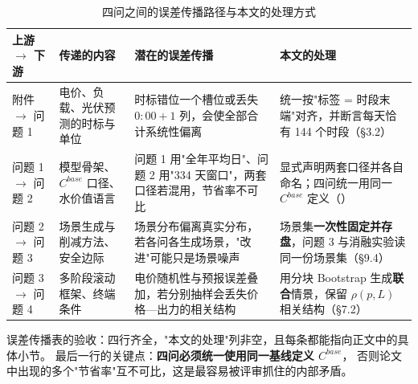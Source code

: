 \begin{table}[htbp]
  \centering
  \caption{四问之间的误差传播路径与本文的处理方式}
  \label{tab:errorprop}
  \footnotesize
  \begin{tabularx}{\linewidth}{L{2.0cm} L{3.4cm} L{4.2cm} Y}
    \toprule
    上游 \(\rightarrow\) 下游 & 传递的内容 & 潜在的误差传播 & 本文的处理 \\
    \midrule
    附件 \(\rightarrow\) 问题 1
      & 电价、负载、光伏预测的时标与单位
      & 时标错位一个槽位或丢失 \(0{:}00{+}1\) 列，会使全部合计系统性偏离
      & 统一按"标签 = 时段末端"对齐，并断言每天恰有 144 个时段（§3.2） \\
    \addlinespace
    问题 1 \(\rightarrow\) 问题 2
      & 模型骨架、\(C^{base}\) 口径、水价值语言
      & 问题 1 用"全年平均日"、问题 2 用"334 天窗口"，两套口径若混用，节省率不可比
      & 显式声明两套口径并各自命名；四问统一用同一 \(C^{base}\) 定义（） \\
    \addlinespace
    问题 2 \(\rightarrow\) 问题 3
      & 场景生成与削减方法、安全边际
      & 场景分布偏离真实分布，若各问各生成场景，"改进"可能只是场景噪声
      & 场景集\textbf{一次性固定并存盘}，问题 3 与消融实验读同一份场景集（§9.4） \\
    \addlinespace
    问题 3 \(\rightarrow\) 问题 4
      & 多阶段滚动框架、终端条件
      & 电价随机性与预报误差叠加，若分别抽样会丢失价格—出力的相关结构
      & 用分块 Bootstrap 生成\textbf{联合}情景，保留 \(\rho(p,L)\) 相关结构（§7.2） \\
    \bottomrule
  \end{tabularx}
\end{table}

\begin{guideblock}
误差传播表的验收：四行齐全，"本文的处理"列非空，且每条都能指向正文中的具体小节。
最后一行的关键点：\textbf{四问必须统一使用同一基线定义 \(C^{base}\)}，
否则论文中出现的多个"节省率"互不可比，这是最容易被评审抓住的内部矛盾。
\end{guideblock}
